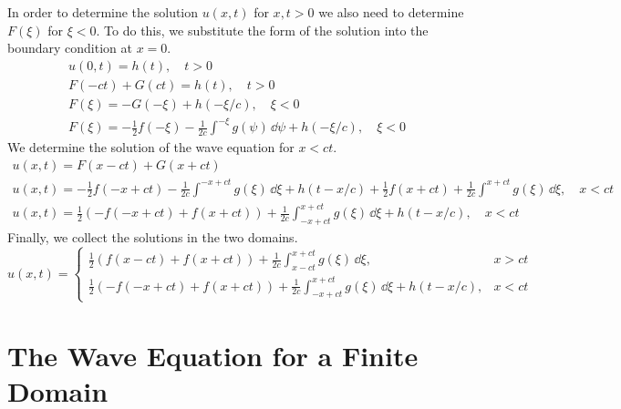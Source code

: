 In order to determine the solution $u(x,t)$ for $x,t > 0$ we also need to 
determine $F(\xi)$ for $\xi < 0$.  To do this, we substitute the form of the 
solution into the boundary condition at $x = 0$.
\begin{gather*}
  u(0,t) = h(t), \quad t > 0
  \\
  F(-c t) + G(c t) = h(t), \quad  t > 0 
  \\
  F(\xi) = -  G(-\xi) + h(-\xi/c), \quad \xi < 0 
  \\
  F(\xi) = - \frac{1}{2} f(-\xi) - \frac{1}{2c} \int^{-\xi} g(\psi) \,\dd \psi + h(-\xi/c), 
  \quad \xi < 0
\end{gather*}
We determine the solution of the wave equation for $x < c t$.
\begin{gather*}
  u(x,t) = F(x - c t) + G(x + c t)
  \\
  u(x,t) = - \frac{1}{2} f(-x + c t) - \frac{1}{2c} \int^{-x + c t} g(\xi) \,\dd \xi 
  + h(t - x/c)
  + \frac{1}{2} f(x + c t) + \frac{1}{2c} \int^{x + c t} g(\xi) \,\dd \xi, \quad x < c t
  \\
  u(x,t) = \frac{1}{2} \left( - f(-x + c t) + f(x + c t) \right)
  + \frac{1}{2c} \int_{-x + c t}^{x + c t} g(\xi) \,\dd \xi + h(t - x/c), \quad x < c t
\end{gather*}
Finally, we collect the solutions in the two domains.
\[
\boxed{
  u(x,t) = \begin{cases}
    \frac{1}{2} \left( f(x - c t) + f(x + c t) \right)
    + \frac{1}{2c} \int_{x - c t}^{x + c t} g(\xi) \,\dd \xi, &x > c t
    \\
    \frac{1}{2} \left( - f(-x + c t) + f(x + c t) \right)
    + \frac{1}{2c} \int_{-x + c t}^{x + c t} g(\xi) \,\dd \xi + h(t - x/c), &x < c t
  \end{cases}
  }
\]









\section{The Wave Equation for a Finite Domain}




